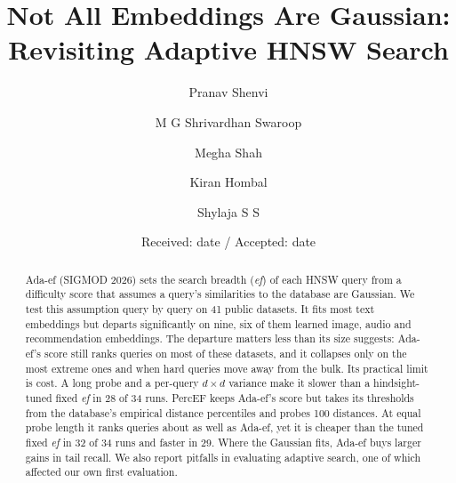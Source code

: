 \documentclass[twocolumn]{svjour3}
\newcommand{\ef}{\textit{ef}}
\begin{document}
\title{Not All Embeddings Are Gaussian: Revisiting Adaptive HNSW Search}
\author{Pranav Shenvi \and M G Shrivardhan Swaroop \and Megha Shah \and Kiran Hombal \and Shylaja S S}
\date{Received: date / Accepted: date}
\maketitle

\begin{abstract}
Ada-ef (SIGMOD 2026) sets the search breadth (\ef{}) of each HNSW query from a difficulty score
that assumes a query's similarities to the database are Gaussian. We test this assumption query by
query on 41 public datasets. It fits most text embeddings but departs significantly on nine, six of
them learned image, audio and recommendation embeddings. The departure matters less than its size
suggests: Ada-ef's score still ranks queries on most of these datasets, and it collapses only on the
most extreme ones and when hard queries move away from the bulk. Its practical limit is cost. A long
probe and a per-query $d \times d$ variance make it slower than a hindsight-tuned fixed \ef{} in 28
of 34 runs. PercEF keeps Ada-ef's score but takes its thresholds from the database's empirical
distance percentiles and probes 100 distances. At equal probe length it ranks queries about as well
as Ada-ef, yet it is cheaper than the tuned fixed \ef{} in 32 of 34 runs and faster in 29. Where the
Gaussian fits, Ada-ef buys larger gains in tail recall. We also report pitfalls in evaluating
adaptive search, one of which affected our own first evaluation.
\end{abstract}

\end{document}
